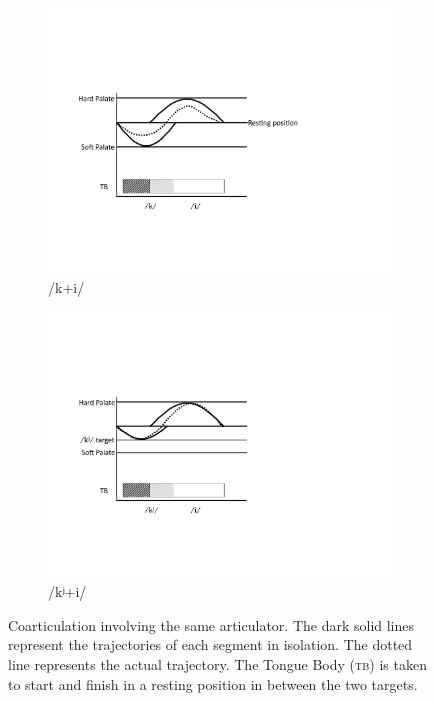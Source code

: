 \begin{figure}[H]

\begin{subfigure}[t]{.60\textwidth}
        \includegraphics[width=\linewidth]{figures/palatalizationa.pdf}
        \caption{\label{fig:/k+i}/k+i/}
    \end{subfigure}\hfill
    \begin{subfigure}[t]{.40\textwidth}
        \includegraphics[width=\linewidth]{figures/palatalizationb.pdf}
        \caption{\label{fig:/k=0002B2+i/} {/kʲ+i/}}
    \end{subfigure}
    
    

\caption{Coarticulation involving the same articulator. The dark solid lines
represent the trajectories of each segment in isolation. The dotted
line represents the actual trajectory. The Tongue Body (\textsc{tb}) is taken
to start and finish in a resting position in between the two targets. }
\end{figure}

